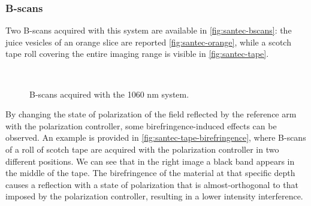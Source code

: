\subsubsection{B-scans}

Two B-scans acquired with this system are available in \autoref{fig:santec-bscans}: the juice vesicles of an orange slice are reported \autoref{fig:santec-orange}, while a scotch tape roll covering the entire imaging range is visible in \autoref{fig:santec-tape}. 

\begin{figure}[htb]
	\myfloatalign
	 \quad
	 \\
	\caption{B-scans acquired with the 1060 nm system.}\label{fig:santec-bscans}
\end{figure}

By changing the state of polarization of the field reflected by the reference arm with the polarization controller, some birefringence-induced effects can be observed. An example is provided in \autoref{fig:santec-tape-birefringence}, where B-scans of a roll of scotch tape are acquired with the polarization controller in two different positions. We can see that in the right image a black band appears in the middle of the tape. The birefringence of the material at that specific depth causes a reflection with a state of polarization that is almost-orthogonal to that imposed by the polarization controller, resulting in a lower intensity interference. 

